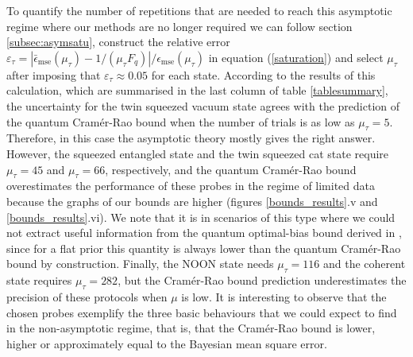 To quantify the number of repetitions that are needed to reach this asymptotic regime where our methods are no longer required we can follow section \ref{subsec:asymsatu}, construct the relative error $\varepsilon_\tau = |\bar{\epsilon}_{\mathrm{mse}}(\mu_{\tau}) - 1/(\mu_{\tau} F_q)|/\epsilon_{\mathrm{mse}}(\mu_{\tau})$ in equation (\ref{saturation}) and select $\mu_{\tau}$ after imposing that $\varepsilon_\tau \approx 0.05$ for each state. According to the results of this calculation, which are summarised in the last column of table \ref{tablesummary}, the uncertainty for the twin squeezed vacuum state agrees with the prediction of the quantum Cram\'{e}r-Rao bound when the number of trials is as low as $\mu_{\tau} = 5$. Therefore, in this case the asymptotic theory mostly gives the right answer. However, the squeezed entangled state and the twin squeezed cat state require $\mu_{\tau}=45$ and $\mu_{\tau}=66$, respectively, and the quantum Cram\'{e}r-Rao bound overestimates the performance of these probes in the regime of limited data because the graphs of our bounds are higher (figures \ref{bounds_results}.v and \ref{bounds_results}.vi). We note that it is in scenarios of this type where we could not extract useful information from the quantum optimal-bias bound derived in \cite{liu2016}, since for a flat prior this quantity is always lower than the quantum Cram\'{e}r-Rao bound by construction. Finally, the NOON state needs $\mu_{\tau}=116$ and the coherent state requires $\mu_{\tau}=282$, but the Cram\'{e}r-Rao bound prediction underestimates the precision of these protocols when $\mu$ is low. It is interesting to observe that the chosen probes exemplify the three basic behaviours that we could expect to find in the non-asymptotic regime, that is, that the Cram\'{e}r-Rao bound is lower, higher or approximately equal to the Bayesian mean square error.

